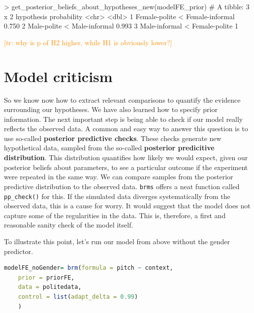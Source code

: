 \documentclass[nobib]{tufte-handout}
\newcommand{\tr}[1]{\textcolor{DarkOrange}{[tr: #1]}}
\begin{document}
\begin{minipage}[]{\textwidth}
\begin{rc}
> get_posterior_beliefs_about_hypotheses_new(modelFE_prior)
# A tibble: 3 x 2
  hypothesis                      probability
  <chr>                                 <dbl>
1 Female-polite < Female-informal       0.750
2 Male-polite < Male-informal           0.993
3 Male-informal < Female-polite         1    
\end{rc}
\end{minipage}

\tr{why is p of H2 higher, while H1 is obviously lower?}

\section{Model criticism}

So we know now how to extract relevant comparisons to quantify the evidence surrounding our hypotheses. We have also learned how to specify prior information. The next important step is being able to check if our model really reflects the observed data. A common and easy way to answer this question is to use so-called \textbf{posterior predictive checks}. These checks generate new hypothetical data, sampled from the so-called \textbf{posterior predicitive distribution}. This distribution quantifies how likely we would expect, given our posterior beliefs about parameters, to see a particular outcome if the experiment were repeated in the same way. We can compare samples from the posterior predictive distribution to the observed data. \texttt{brms} offers a neat function called \texttt{pp\_check()} for this. If the simulated data diverges systematically from the observed data, this is a cause for worry. It would suggest that the model does not capture some of the regularities in the data. This is, therefore, a first and reasonable sanity check of the model itself.

To illustrate this point, let's run our model from above without the gender predictor. 

\bigskip

\begin{minipage}[]{1\textwidth}
\begin{lstlisting}[language=R]
modelFE_noGender= brm(formula = pitch ~ context,
	prior = priorFE,
	data = politedata,
	control = list(adapt_delta = 0.99)
	)
\end{lstlisting}
\end{minipage}
\end{document}

